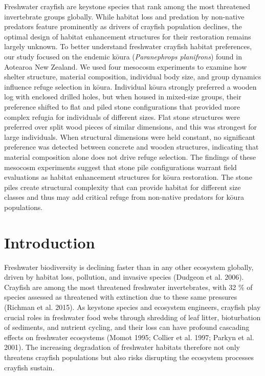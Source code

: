 \documentclass[
  12pt,
  a4paper,
]{scrbook}
\begin{document}
Freshwater crayfish are keystone species that rank among the most
threatened invertebrate groups globally. While habitat loss and
predation by non-native predators feature prominently as drivers of
crayfish population declines, the optimal design of habitat enhancement
structures for their restoration remains largely unknown. To better
understand freshwater crayfish habitat preferences, our study focused on
the endemic kōura (\emph{Paranephrops planifrons}) found in Aotearoa New
Zealand. We used four mesocosm experiments to examine how shelter
structure, material composition, individual body size, and group
dynamics influence refuge selection in kōura. Individual kōura strongly
preferred a wooden log with enclosed drilled holes, but when housed in
mixed-size groups, their preference shifted to flat and piled stone
configurations that provided more complex refugia for individuals of
different sizes. Flat stone structures were preferred over split wood
pieces of similar dimensions, and this was strongest for large
individuals. When structural dimensions were held constant, no
significant preference was detected between concrete and wooden
structures, indicating that material composition alone does not drive
refuge selection. The findings of these mesocosm experiments suggest
that stone pile configurations warrant field evaluations as habitat
enhancement structures for kōura restoration. The stone piles create
structural complexity that can provide habitat for different size
classes and thus may add critical refuge from non-native predators for
kōura populations.

\hfill\break


\chapter{Introduction}\label{introduction-2}

Freshwater biodiversity is declining faster than in any other ecosystem
globally, driven by habitat loss, pollution, and invasive species
(Dudgeon et al. 2006). Crayfish are among the most threatened freshwater
invertebrates, with 32 \% of species assessed as threatened with
extinction due to these same pressures (Richman et al. 2015). As
keystone species and ecosystem engineers, crayfish play crucial roles in
freshwater food webs through shredding of leaf litter, bioturbation of
sediments, and nutrient cycling, and their loss can have profound
cascading effects on freshwater ecosystems (Momot 1995; Collier et al.
1997; Parkyn et al. 2001). The increasing degradation of freshwater
habitats therefore not only threatens crayfish populations but also
risks disrupting the ecosystem processes crayfish sustain.
\end{document}
